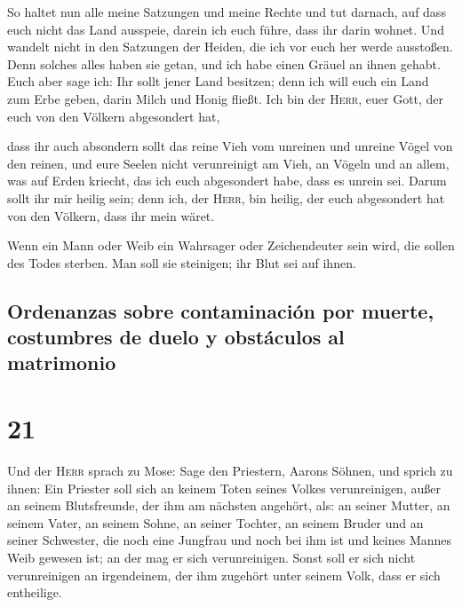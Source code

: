  So haltet nun alle meine Satzungen und meine Rechte und
tut darnach, auf dass euch nicht das Land ausspeie, darein ich euch
führe, dass ihr darin wohnet.  Und wandelt nicht in den
Satzungen der Heiden, die ich vor euch her werde ausstoßen. Denn solches
alles haben sie getan, und ich habe einen Gräuel an ihnen gehabt.
 Euch aber sage ich: Ihr sollt jener Land besitzen; denn
ich will euch ein Land zum Erbe geben, darin Milch und Honig fließt. Ich
bin der \textsc{Herr}, euer Gott, der euch von den Völkern abgesondert
hat,

 dass ihr auch absondern sollt das reine Vieh vom
unreinen und unreine Vögel von den reinen, und eure Seelen nicht
verunreinigt am Vieh, an Vögeln und an allem, was auf Erden kriecht, das
ich euch abgesondert habe, dass es unrein sei.  Darum
sollt ihr mir heilig sein; denn ich, der \textsc{Herr}, bin heilig, der
euch abgesondert hat von den Völkern, dass ihr mein wäret.

 Wenn ein Mann oder Weib ein Wahrsager oder Zeichendeuter
sein wird, die sollen des Todes sterben. Man soll sie steinigen; ihr
Blut sei auf ihnen.

\hypertarget{ordenanzas-sobre-contaminaciuxf3n-por-muerte-costumbres-de-duelo-y-obstuxe1culos-al-matrimonio}{%
\subsection{Ordenanzas sobre contaminación por muerte, costumbres de
duelo y obstáculos al
matrimonio}\label{ordenanzas-sobre-contaminaciuxf3n-por-muerte-costumbres-de-duelo-y-obstuxe1culos-al-matrimonio}}

\hypertarget{section-20}{%
\section{21}\label{section-20}}

 Und der \textsc{Herr} sprach zu Mose: Sage den Priestern,
Aarons Söhnen, und sprich zu ihnen: Ein Priester soll sich an keinem
Toten seines Volkes verunreinigen,  außer an seinem
Blutsfreunde, der ihm am nächsten angehört, als: an seiner Mutter, an
seinem Vater, an seinem Sohne, an seiner Tochter, an seinem Bruder
 und an seiner Schwester, die noch eine Jungfrau und noch
bei ihm ist und keines Mannes Weib gewesen ist; an der mag er sich
verunreinigen.  Sonst soll er sich nicht verunreinigen an
irgendeinem, der ihm zugehört unter seinem Volk, dass er sich
entheilige.

